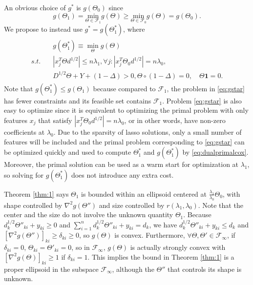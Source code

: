An obvious choice of $g^*$ is $g(\Theta_{0})$ since
\begin{equation*}
  g(\Theta_{1}) = \underset{\Theta\in \mathcal{F}_{1}}{\mathrm{min}}g(\Theta)\geq\underset{\Theta\in \mathcal{F}_{0}}{\mathrm{min}}g(\Theta) = g\left(\Theta_{0}\right).
\end{equation*}
We propose to instead use $g^* = g(\Theta^*_{1})$, where
\begin{gather}
    \label{eq:gstar}
    \begin{aligned}
        &g(\Theta^*_{1}) \equiv \min_\Theta g(\Theta)\\
        s.t.\quad &|x_j^T\Theta d^{1/2}|\leq n\lambda_1,\forall j:|x_j^T\Theta_{0} d^{1/2}|= n\lambda_0,\\&D^{1/2}\Theta+Y+(1-\Delta)> 0, \Theta\circ(1-\Delta)=0,\quad \Theta\mathbf{1}=0.
    \end{aligned}
\end{gather}
Note that $g(\Theta^*_{1}) \leq g(\Theta_{1})$ because compared to $\mathcal{F}_{1}$, the problem in \eqref{eq:gstar} has fewer constraints and its feasible set contains $\mathcal{F}_{1}$. Problem \eqref{eq:gstar} is also easy to optimize since it is equivalent to optimizing the primal problem with only features $x_j$ that satisfy $|x_j^T\Theta_{0} d^{1/2}|= n\lambda_0$, or in other words, have non-zero coefficients at $\lambda_0$. Due to the sparsity of lasso solutions, only a small number of features will be included and the primal problem corresponding to \eqref{eq:gstar} can be optimized quickly and used to compute $\Theta_1^*$ and $g(\Theta_1^*)$ by \eqref{eq:dualprimalcox}. Moreover, the primal solution can be used as a warm start for optimization at $\lambda_1$, so solving for $g(\Theta^*_{1})$ does not introduce any extra cost.

Theorem \ref{thm:1} says $\Theta_{1}$ is bounded within an ellipsoid centered at $\frac{\lambda_1}{\lambda_0}\Theta_{0}$, with shape controlled by $\nabla^2g(\Theta'')$ and size controlled by $r(\lambda_1,\lambda_0)$. Note that the center and the size do not involve the unknown quantity $\Theta_{1}$. Because $d_k^{1/2}\Theta''_{ki}+y_{ki}\geq 0$ and $\sum_{i=1}^nd_k^{1/2}\Theta''_{ki}+y_{ki}=d_k$, we have $d_k^{1/2}\Theta''_{ki}+y_{ki}\leq d_k$ and $[\nabla^2 g(\Theta'')]_{ki}\geq\delta_{ki}\geq 0$, so $g(\Theta)$ is convex. Furthermore, $\forall\Theta,\Theta'\in\mathcal{F}_{\infty}$, if $\delta_{ki}=0$, $\Theta_{ki}=\Theta'_{ki}=0$, so in $\mathcal{F}_{\infty}$, $g(\Theta)$ is actually strongly convex with $[\nabla^2 g(\Theta)]_{ki}\geq 1$ if $\delta_{ki}=1$. This implies the bound in Theorem \ref{thm:1} is a proper ellipsoid in the subspace $\mathcal{F}_{\infty}$, although the $\Theta''$ that controls its shape is unknown.

